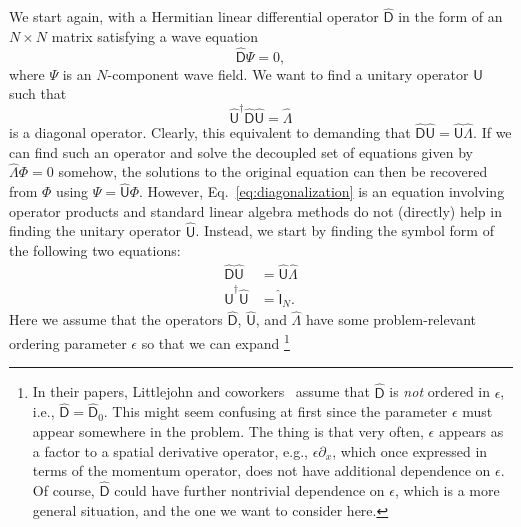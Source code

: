 We start again, with a Hermitian linear differential operator $\widehat{\mathsf{D}}$ in the form of an $N\times N$ matrix satisfying a wave equation
%
\begin{equation}
  \widehat{\mathsf{D}}\Psi = 0,
\end{equation}
%
where $\Psi$ is an $N$-component wave field.
%
We want to find a unitary operator $\widehat{\mathsf{U}}$ such that
%
\begin{equation}
  \widehat{\mathsf{U}}^{\dagger}\widehat{\mathsf{D}}\widehat{\mathsf{U}} = \widehat{\Lambda}\label{eq:diagonalization}
\end{equation}
%
is a diagonal operator.
Clearly, this equivalent to demanding that $\widehat{\mathsf{D}}\widehat{\mathsf{U}} = \widehat{\mathsf{U}}\widehat{\Lambda}$.
If we can find such an operator and solve the decoupled set of equations given by $\widehat{\Lambda}\Phi = 0$ somehow,
the solutions to the original equation can then be recovered from $\Phi$ using $\Psi = \widehat{\mathsf{U}}\Phi$.
However, Eq.~\eqref{eq:diagonalization} is an equation involving operator products and standard linear algebra methods do not (directly) help in finding the unitary operator $\widehat{\mathsf{U}}$.
Instead, we start by finding the symbol form of the following two equations:
%
\begin{equation}
  \begin{aligned}
    \widehat{\mathsf{D}}\widehat{\mathsf{U}} &= \widehat{\mathsf{U}}\widehat{\Lambda}\\
    \widehat{\mathsf{U}}^{\dagger}\widehat{\mathsf{U}} &= \hat{\mathsf{I}}_{N}.
  \end{aligned}
  \label{eq:diagonal2}
\end{equation}
%
Here we assume that the operators $\widehat{\mathsf{D}}$, $\widehat{\mathsf{U}}$, and $\widehat{\Lambda}$ have some problem-relevant ordering parameter $\epsilon$ so that we can expand%
\footnote{In their papers, Littlejohn and coworkers~\cite{littlejohn1991,weigert1993} assume that $\widehat{\mathsf{D}}$ is \emph{not} ordered in $\epsilon$, i.e., $\widehat{\mathsf{D}} = \widehat{\mathsf{D}}_{0}$.
  This might seem confusing at first since the parameter $\epsilon$ must appear somewhere in the problem.
  The thing is that very often, $\epsilon$ appears as a factor to a spatial derivative operator, e.g., $\epsilon\partial_{x}$, which once expressed in terms of the momentum operator, does not have additional dependence on $\epsilon$.
  Of course, $\widehat{\mathsf{D}}$ could have further nontrivial dependence on $\epsilon$, which is a more general situation, and the one we want to consider here.
}
